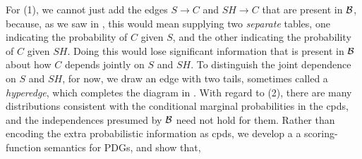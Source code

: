 \documentclass{article}
\theoremstyle{plain}
\theoremstyle{definition}
\newenvironment{example}
	{\pushQED{\qed}\renewcommand{\qedsymbol}{$\triangle$}\examplex}
	{\popQED\endexamplex%
}
\theoremstyle{remark}
\numberwithin{equation}{section}
\begin{document}
\begin{example}[emulating a BN]
      For (1), we cannot just add the edges
                $S \to C$ and $SH \to C$ that are present in $\cal B$,
                because, as we saw in , this
                would mean supplying two \emph{separate} tables, one
                indicating the probability of $C$ given $S$, and the
                other indicating the probability of $C$ given
                $\mathit{SH}$.
Doing this would lose significant information that is present in $\cal
B$  about how $C$ depends jointly on $S$ and $SH$.
		To distinguish the joint dependence on $S$ and
                $\mathit{SH}$, for now, we draw an edge with two
                tails, sometimes called a \emph{hyperedge}, which
                completes the diagram in . 
        With regard to (2), there are many
                distributions consistent with the conditional marginal
        probabilities in the cpds, and the independences presumed by
        $\cal B$ need not hold for them. Rather than encoding the
        extra probabilistic information as cpds, we develop a
        a scoring-function semantics for PDGs, and show that,  

\end{example}
\end{document}
